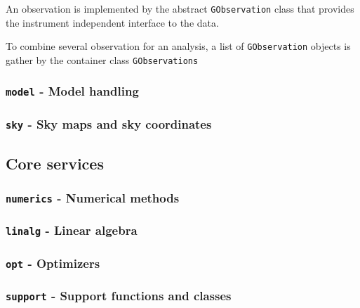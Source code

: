 \documentclass{article}[12pt,a4]
\begin{document}
An observation is implemented by the abstract {\tt GObservation} class that provides
the instrument independent interface to the data.

To combine several observation for an analysis, a list of {\tt GObservation} objects is
gather by the container class {\tt GObservations}


\subsubsection{{\tt model} - Model handling}
\label{sec:model}


\subsubsection{{\tt sky} - Sky maps and sky coordinates}
\label{sec:sky}


\subsection{Core services}

\subsubsection{{\tt numerics} - Numerical methods}
\label{sec:numerics}


\subsubsection{{\tt linalg} - Linear algebra}
\label{sec:linalg}


\subsubsection{{\tt opt} - Optimizers}
\label{sec:opt}

\subsubsection{{\tt support} - Support functions and classes}
\label{sec:support}


\end{document}
